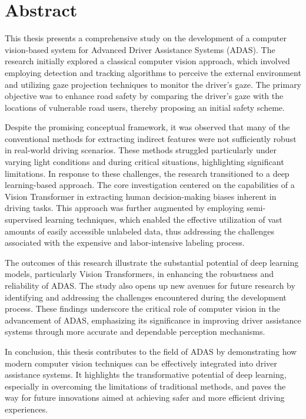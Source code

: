 \thispagestyle{empty}
\section*{Abstract}
\vspace{0.5cm}
This thesis presents a comprehensive study on the development of a computer 
vision-based system for Advanced Driver Assistance Systems (ADAS). The research 
initially explored a classical computer vision approach, which involved 
employing detection and tracking algorithms to perceive the external 
environment and utilizing gaze projection techniques to monitor the driver’s 
gaze. The primary objective was to enhance road safety by comparing the 
driver’s gaze with the locations of vulnerable road users, thereby proposing 
an initial safety scheme.

Despite the promising conceptual framework, it was observed that many of the 
conventional methods for extracting indirect features were not sufficiently 
robust in real-world driving scenarios. These methods struggled particularly 
under varying light conditions and during critical situations, highlighting 
significant limitations. In response to these challenges, the research 
transitioned to a deep learning-based approach. The core investigation centered 
on the capabilities of a Vision Transformer in extracting human decision-making 
biases inherent in driving tasks. This approach was further augmented by 
employing semi-supervised learning techniques, which enabled the effective 
utilization of vast amounts of easily accessible unlabeled data, thus 
addressing the challenges associated with the expensive and labor-intensive 
labeling process.

The outcomes of this research illustrate the substantial potential of deep 
learning models, particularly Vision Transformers, in enhancing the robustness 
and reliability of ADAS. The study also opens up new avenues for future 
research by identifying and addressing the challenges encountered during the 
development process. These findings underscore the critical role of computer 
vision in the advancement of ADAS, emphasizing its significance in improving 
driver assistance systems through more accurate and dependable perception 
mechanisms.

In conclusion, this thesis contributes to the field of ADAS by demonstrating 
how modern computer vision techniques can be effectively integrated into driver 
assistance systems. It highlights the transformative potential of deep 
learning, especially in overcoming the limitations of traditional methods, and 
paves the way for future innovations aimed at achieving safer and more 
efficient driving experiences.

\afterpage{\blankpage}
